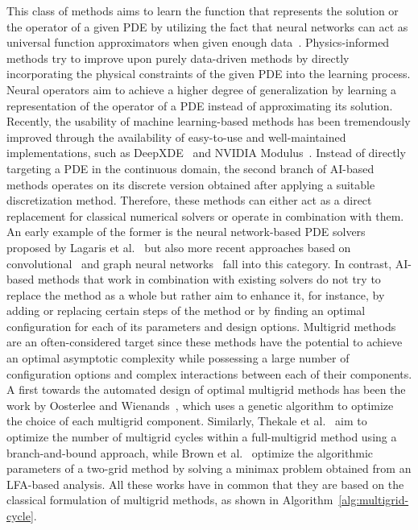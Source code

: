 This class of methods aims to learn the function that represents the solution or the operator of a given PDE by utilizing the fact that neural networks can act as universal function approximators when given enough data~\cite{hornik1989multilayer}.
Physics-informed methods try to improve upon purely data-driven methods by directly incorporating the physical constraints of the given PDE into the learning process.
Neural operators aim to achieve a higher degree of generalization by learning a representation of the operator of a PDE instead of approximating its solution.
Recently, the usability of machine learning-based methods has been tremendously improved through the availability of easy-to-use and well-maintained implementations, such as DeepXDE~\cite{lu2021deepxde} and NVIDIA Modulus~\cite{hennigh2021nvidia}. 
Instead of directly targeting a PDE in the continuous domain, the second branch of AI-based methods operates on its discrete version obtained after applying a suitable discretization method.
Therefore, these methods can either act as a direct replacement for classical numerical solvers or operate in combination with them.
An early example of the former is the neural network-based PDE solvers proposed by Lagaris et al.~\cite{lagaris1998artificial} but also more recent approaches based on convolutional~\cite{thuerey2020deep} and graph neural networks~\cite{pfaff2020learning} fall into this category.
In contrast, AI-based methods that work in combination with existing solvers do not try to replace the method as a whole but rather aim to enhance it, for instance, by adding or replacing certain steps of the method or by finding an optimal configuration for each of its parameters and design options.
Multigrid methods are an often-considered target since these methods have the potential to achieve an optimal asymptotic complexity while possessing a large number of configuration options and complex interactions between each of their components.
A first towards the automated design of optimal multigrid methods has been the work by Oosterlee and Wienands~\cite{oosterlee2003genetic}, which uses a genetic algorithm to optimize the choice of each multigrid component.
Similarly, Thekale et al.~\cite{thekale2010optimizing} aim to optimize the number of multigrid cycles within a full-multigrid method using a branch-and-bound approach, while Brown et al.~\cite{brown2021tuning} optimize the algorithmic parameters of a two-grid method by solving a minimax problem obtained from an LFA-based analysis.
All these works have in common that they are based on the classical formulation of multigrid methods, as shown in Algorithm~\ref{alg:multigrid-cycle}.
